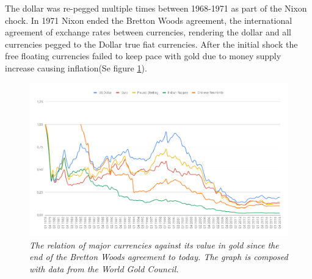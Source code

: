 The dollar was re-pegged multiple times between 1968-1971 as part of the Nixon chock\cite{bordo:bretton:woods}. In 1971 Nixon ended the Bretton Woods agreement\cite{bordo:bretton:woods}, the international agreement of exchange rates between currencies, rendering the dollar and all currencies pegged to the Dollar true fiat currencies. After the initial shock the free floating currencies failed to keep pace with gold due to money supply increase causing inflation(Se figure \ref{fig:gold:price:major:currency}).

\begin{figure}[!htb]
	\centering
	\includegraphics[width=16cm]{external/gold-price.png}
	\caption{\textit{The relation of major currencies against its value in gold since the end of the Bretton Woods agreement to
			today. The graph is composed with data from the World Gold Council\cite{world:gold:council}. 
	}}
	\label{fig:gold:price:major:currency}
\end{figure}

\twocolumn

